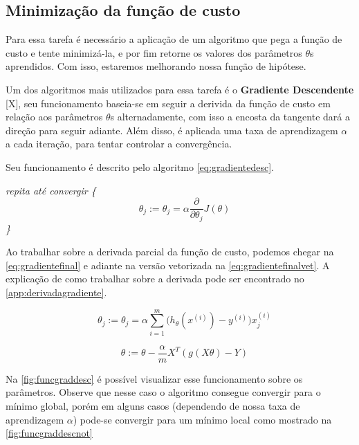 \subsection{Minimização da função de custo}

Para essa tarefa é necessário a aplicação de um algoritmo que pega a função de custo e tente minimizá-la, e por fim retorne os valores dos parâmetros $ \theta $s aprendidos. Com isso, estaremos melhorando nossa função de hipótese. 

Um dos algoritmos mais utilizados para essa tarefa é o \textbf{Gradiente Descendente} [X], seu funcionamento baseia-se em seguir a derivida da função de custo em relação aos parâmetros $\theta$s alternadamente, com isso a encosta da tangente dará a direção para seguir adiante. Além disso, é aplicada uma taxa de aprendizagem $ \alpha $ a cada iteração, para tentar controlar a convergência.

Seu funcionamento é descrito pelo algoritmo \ref{eq:gradientedesc}.

\textit{repita até convergir \{}
\begin{equation}
\label{eq:gradientedesc}
\quad \theta_j := \theta_j = \alpha \frac{\partial}{\partial\theta_j} J(\theta)
\end{equation}
\textit{\quad\quad\quad \}}

Ao trabalhar sobre a derivada parcial da função de custo, podemos chegar na \autoref{eq:gradientefinal} e adiante na versão vetorizada na \autoref{eq:gradientefinalvet}. A explicação de como trabalhar sobre a derivada pode ser encontrado no \autoref{app:derivadagradiente}.

\begin{equation}
\quad \theta_j := \theta_j = \alpha \sum\limits_{i=1}^{m}\Big(h_{\theta}(x^{(i)}) - y^{(i)} \Big) x_j^{(i)} \label{eq:gradientefinal}
\end{equation}

\begin{equation}
\quad \theta := \theta - \frac{\alpha}{m}X^T(g(X\theta) - Y) \label{eq:gradientefinalvet}
\end{equation}

Na \autoref{fig:funcgraddesc} é possível visualizar esse funcionamento sobre os parâmetros. Observe que nesse caso o algoritmo consegue convergir para o mínimo global, porém em alguns casos (dependendo de nossa taxa de aprendizagem $ \alpha $) pode-se convergir para um mínimo local como mostrado na \autoref{fig:funcgraddescnot}

